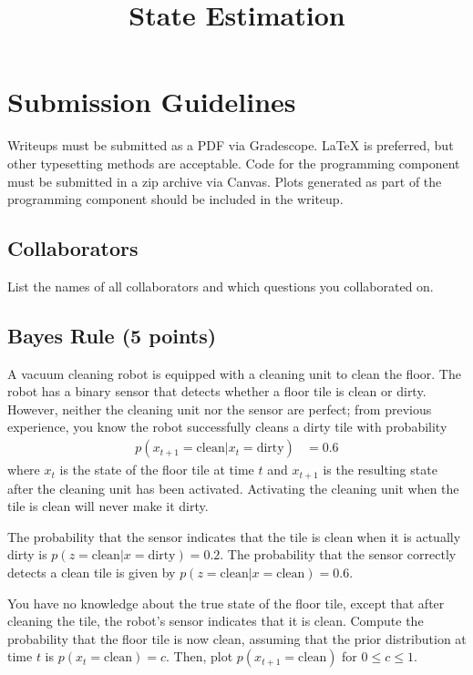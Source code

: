 \documentclass{article}
\title{State Estimation}
\author{}
\date{}
\newcommand{\?}{\stackrel{?}{=}}
\begin{document}
\maketitle

\section*{Submission Guidelines}

Writeups must be submitted as a PDF via Gradescope.
\LaTeX{} is preferred, but other typesetting methods are acceptable.
Code for the programming component must be submitted in a zip archive via Canvas.
Plots generated as part of the programming component should be included in the writeup.


\subsection{Collaborators}

List the names of all collaborators and which questions you collaborated on.


\subsection{Bayes Rule (5 points)}

A vacuum cleaning robot is equipped with a cleaning unit to clean the floor.
The robot has a binary sensor that detects whether a floor tile is clean or dirty.
However, neither the cleaning unit nor the sensor are perfect;
from previous experience, you know the robot successfully cleans a dirty tile with probability
\begin{align*}
  p(x_{t+1} = \text{clean} | x_{t} = \text{dirty}) &= 0.6
\end{align*}
where $x_t$ is the state of the floor tile at time $t$ and $x_{t+1}$ is the resulting state after the cleaning unit has been activated.
Activating the cleaning unit when the tile is clean will never make it dirty.

The probability that the sensor indicates that the tile is clean when it is actually dirty is $p(z = \text{clean} | x = \text{dirty}) = 0.2$.
The probability that the sensor correctly detects a clean tile is given by $p(z = \text{clean} | x = \text{clean}) = 0.6$.

You have no knowledge about the true state of the floor tile, except that after cleaning the tile, the robot's sensor indicates that it is clean.
Compute the probability that the floor tile is now clean, assuming that the prior distribution at time $t$ is $p(x_t = \text{clean}) = c$.
Then, plot $p(x_{t+1} = \text{clean})$ for $0 \leq c \leq 1$.
\end{document}
